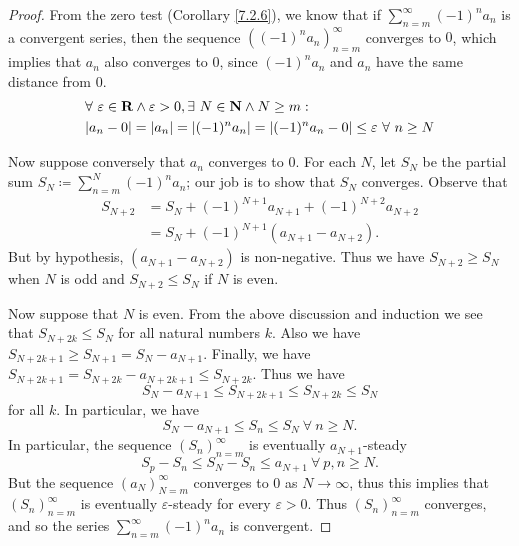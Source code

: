 \begin{proof}
    From the zero test (Corollary \ref{7.2.6}), we know that if \(\sum_{n = m}^\infty (-1)^n a_n\) is a convergent series, then the sequence \(((-1)^n a_n)_{n = m}^\infty\) converges to \(0\), which implies that \(a_n\) also converges to \(0\), since \((-1)^n a_n\) and \(a_n\) have the same distance from \(0\).
    \begin{align*}
         & \forall\ \varepsilon \in \mathbf{R} \land \varepsilon > 0, \exists\ N \in \mathbf{N} \land N \geq m :        \\
         & \abs*{a_n - 0} = \abs*{a_n} = \abs*{(-1)^n a_n} = \abs*{(-1)^n a_n - 0} \leq \varepsilon \ \forall\ n \geq N
    \end{align*}

    Now suppose conversely that \(a_n\) converges to \(0\).
    For each \(N\), let \(S_N\) be the partial sum \(S_N \coloneqq \sum_{n = m}^N (-1)^n a_n\);
    our job is to show that \(S_N\) converges.
    Observe that
    \begin{align*}
        S_{N + 2} & = S_N + (-1)^{N + 1} a_{N + 1} + (-1)^{N + 2} a_{N + 2} \\
                  & = S_N + (-1)^{N + 1} (a_{N + 1} - a_{N + 2}).
    \end{align*}
    But by hypothesis, \((a_{N + 1} - a_{N + 2})\) is non-negative.
    Thus we have \(S_{N + 2} \geq S_N\) when \(N\) is odd and \(S_{N + 2} \leq S_N\) if \(N\) is even.

    Now suppose that \(N\) is even.
    From the above discussion and induction we see that \(S_{N + 2k} \leq S_N\) for all natural numbers \(k\).
    Also we have \(S_{N + 2k + 1} \geq S_{N + 1} = S_N - a_{N + 1}\).
    Finally, we have \(S_{N + 2k + 1} = S_{N + 2k} - a_{N + 2k + 1} \leq S_{N + 2k}\).
    Thus we have
    \[
        S_N - a_{N + 1} \leq S_{N + 2k + 1} \leq S_{N + 2k} \leq S_N
    \]
    for all \(k\).
    In particular, we have
    \[
        S_N - a_{N + 1} \leq S_n \leq S_N \ \forall\ n \geq N.
    \]
    In particular, the sequence \((S_n)_{n = m}^\infty\) is eventually \(a_{N + 1}\)-steady
    \[
        S_p - S_n \leq S_N - S_n \leq a_{N + 1} \ \forall\ p, n \geq N.
    \]
    But the sequence \((a_N)_{N = m}^\infty\) converges to \(0\) as \(N \to \infty\), thus this implies that \((S_n)_{n = m}^\infty\) is eventually \(\varepsilon\)-steady for every \(\varepsilon > 0\).
    Thus \((S_n)_{n = m}^\infty\) converges, and so the series \(\sum_{n = m}^\infty (-1)^n a_n\) is convergent.
\end{proof}

